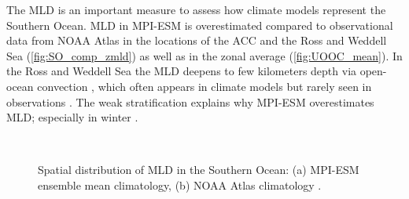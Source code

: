 The \ac{MLD} is an important measure to assess how climate models represent the Southern Ocean. \acs{MLD} in \acs{MPI-ESM} is overestimated compared to observational data from \acs{NOAA} Atlas \citep{Monterey1997} in the locations of the \ac{ACC} and the Ross and Weddell Sea (\autoref{fig:SO_comp_zmld}) as well as in the zonal average (\autoref{fig:UOOC_mean}). In the Ross and Weddell Sea the \acs{MLD} deepens to few kilometers depth via open-ocean convection \citep{Stoessel2015}, which often appears in climate models but rarely seen in observations \citep{Heuze2013,deLavergne2014}. The weak stratification explains why \acs{MPI-ESM} overestimates \acs{MLD}; especially in winter \citep{Sallee2013}.



\begin{figure}[bth]
        \myfloatalign
         \\
        \caption{Spatial distribution of \acf{MLD} in the Southern Ocean: (a) \acs{MPI-ESM} ensemble mean climatology, (b) \acs{NOAA} Atlas climatology \citep{Monterey1997}.} \label{fig:SO_comp_zmld}
\end{figure}
